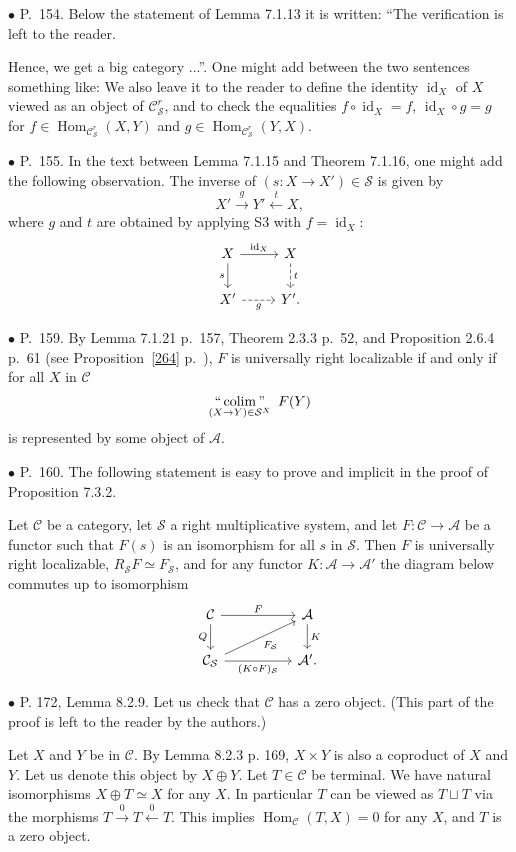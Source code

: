 \documentclass[12pt]{article}
\theoremstyle{remark}%
\newcommand{\bu}{\bullet}
\newcommand{\n}{\noindent}
\newcommand{\A}{\mathcal A}
\newcommand{\C}{\mathcal C}
\newcommand{\SSS}{\mathcal S}
\newcommand{\xl}{\xleftarrow}
\newcommand{\xr}{\xrightarrow}
\newcommand{\pr}{Proposition}
\DeclareMathOperator*{\coli}{colim}
\DeclareMathOperator*{\icolim}{``\coli"}
\DeclareMathOperator{\id}{id}
\DeclareMathOperator{\Hom}{Hom}
\DeclareMathOperator{\h}{Hom}
\begin{document}
\n$\bu$ P.~154. Below the statement of Lemma 7.1.13 it is written: ``The verification is left to the reader.

Hence, we get a big category ...''. One might add between the two sentences something like: We also leave it to the reader to define the identity $\id_X$ of $X$ viewed as an object of $\C^r_{\mathcal S}$, and to check the equalities $f\circ\id_X=f$, $\id_X\circ g=g$ for $f\in\Hom_{\C^r_{\mathcal S}}(X,Y)$ and $g\in\Hom_{\C^r_{\mathcal S}}(Y,X)$. 


\n$\bu$ P.~155. In the text between Lemma 7.1.15 and Theorem 7.1.16, one might add the following observation. The inverse of $(s:X\to X')\in\mathcal S$ is given by 
$$
X'\overset{g}{\to}Y'\overset{t}{\leftarrow}X,
$$
where $g$ and $t$ are obtained by applying S3 with $f=\id_X$:
$$
\begin{tikzcd}
X\ar{r}{\id_X}\ar{d}[swap]{s}&X\ar[dashed]{d}{t}\\ X'\ar[dashed]{r}[swap]{g}&Y'.
\end{tikzcd}
$$ 


\n$\bu$ P.~159. By Lemma 7.1.21 p.~157, Theorem 2.3.3 p.~52, and Proposition 2.6.4 p.~61 (see \pr\ \ref{264} p.~\pageref{264}), $F$ is universally right localizable if and only if for all $X$ in $\C$ 
$$
\icolim_{(X\to Y)\in\SSS^X}\ F(Y) 
$$
is represented by some object of $\A$. 


\n$\bu$ P.~160. The following statement is easy to prove and implicit in the proof of Proposition 7.3.2. 

Let $\C$ be a category, let $\SSS$ a right multiplicative system, and let $F:\C\to\A$ be a functor such that $F(s)$ is an isomorphism for all $s$ in $\SSS$. Then $F$ is universally right localizable, $R_{\SSS}F\simeq F_{\SSS}$, and for any functor $K:\A\to\A'$ the diagram below commutes up to isomorphism
$$
\begin{tikzcd}
\C\ar{rr}{F}\ar{d}[swap]{Q}&&\A\ar{d}{K}\\
\C_{\SSS}\ar{rr}[swap]{(K\circ F)_{\SSS}}\ar{rru}[swap]{F_{\SSS}}&&\A'.
\end{tikzcd}
$$ 


\n$\bu$ P. 172, Lemma 8.2.9. Let us check that $\C$ has a zero object. (This part of the proof is left to the reader by the authors.) 

Let $X$ and $Y$ be in $\C$. By Lemma 8.2.3 p. 169, $X\times Y$ is also a coproduct of $X$ and $Y$. Let us denote this object by $X\oplus Y$. Let $T\in\C$ be terminal. We have natural isomorphisms $X\oplus T\simeq X$ for any $X$. In particular $T$ can be viewed as $T\sqcup T$ via the morphisms $T\xr0T\xl0T$. This implies $\h_\C(T,X)=0$ for any $X$, and $T$ is a zero object. 
\end{document}
